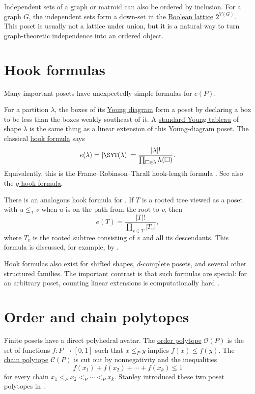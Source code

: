 Independent sets of a graph or matroid can also be ordered by inclusion.  For
a graph $G$, the independent sets form a down-set in the
\hyperref[booleanLattice]{Boolean lattice} $2^{V(G)}$.  This poset is usually
not a lattice under union, but it is a natural way to turn graph-theoretic
independence into an ordered object.

\section[posetHookFormulas]{Hook formulas}

Many important posets have unexpectedly simple formulas for $e(P)$.

For a partition $\lambda$, the boxes of its \hyperref[youngDiagram]{Young
diagram} form a poset by declaring a box to be less than the boxes weakly
southeast of it.  A \hyperref[standardYoungTableau]{standard Young tableau}
of shape $\lambda$ is the same thing as a linear extension of this
Young-diagram poset.  The classical
\hyperref[partitionCores]{hook formula} says
\[
  e(\lambda)=|\SYT(\lambda)|
  = \frac{|\lambda|!}{\prod_{\square\in\lambda} h(\square)}.
\]
Equivalently, this is the Frame--Robinson--Thrall hook-length formula
\cite{FrameRobinsonThrall}.  See also the
\hyperref[prelimQHook]{$q$-hook formula}.

There is an analogous hook formula for
\label{rootedTreePoset}.  If $T$ is a rooted tree
viewed as a poset with $u\leq_T v$ when $u$ is on the path from the root to
$v$, then
\[
  e(T)=\frac{|T|!}{\prod_{v\in T} |T_v|},
\]
where $T_v$ is the rooted subtree consisting of $v$ and all its descendants.
This formula is discussed, for example, by 
\cite{Knuth1998ArtOfProgramming}.

Hook formulas also exist for shifted shapes, $d$-complete posets, and several
other structured families.  The important contrast is that such formulas are
special: for an arbitrary poset, counting linear extensions is computationally
hard \cite{BrightwellWinkler1991}.

\section[posetPolytopes]{Order and chain polytopes}

Finite posets have a direct polyhedral avatar.  The
\hyperref[orderPolytope]{order polytope} $\mathcal{O}(P)$ is the set of
functions $f:P\to [0,1]$ such that $x\leq_P y$ implies $f(x)\leq f(y)$.
The \hyperref[chainPolytope]{chain polytope} $\mathcal{C}(P)$ is cut out by
nonnegativity and the inequalities
\[
  f(x_1)+f(x_2)+\dotsb+f(x_k)\leq 1
\]
for every chain $x_1<_P x_2<_P\dotsb<_P x_k$.  Stanley introduced these two
poset polytopes in \cite{Stanley86TwoPosetPolytopes}.

